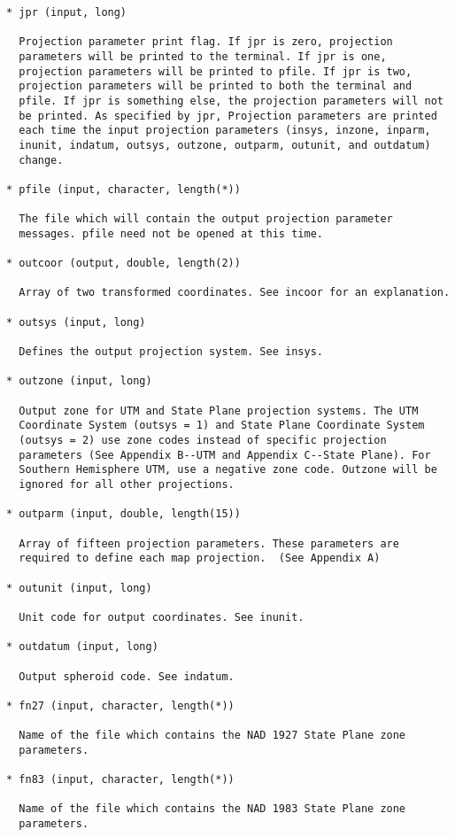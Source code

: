 \begin{verbatim}
* jpr (input, long)

  Projection parameter print flag. If jpr is zero, projection
  parameters will be printed to the terminal. If jpr is one,
  projection parameters will be printed to pfile. If jpr is two,
  projection parameters will be printed to both the terminal and
  pfile. If jpr is something else, the projection parameters will not
  be printed. As specified by jpr, Projection parameters are printed
  each time the input projection parameters (insys, inzone, inparm,
  inunit, indatum, outsys, outzone, outparm, outunit, and outdatum)
  change.

* pfile (input, character, length(*))

  The file which will contain the output projection parameter
  messages. pfile need not be opened at this time.

* outcoor (output, double, length(2))

  Array of two transformed coordinates. See incoor for an explanation.

* outsys (input, long)

  Defines the output projection system. See insys.

* outzone (input, long)

  Output zone for UTM and State Plane projection systems. The UTM
  Coordinate System (outsys = 1) and State Plane Coordinate System
  (outsys = 2) use zone codes instead of specific projection
  parameters (See Appendix B--UTM and Appendix C--State Plane). For
  Southern Hemisphere UTM, use a negative zone code. Outzone will be
  ignored for all other projections.

* outparm (input, double, length(15))

  Array of fifteen projection parameters. These parameters are
  required to define each map projection.  (See Appendix A)

* outunit (input, long)

  Unit code for output coordinates. See inunit.

* outdatum (input, long)

  Output spheroid code. See indatum.

* fn27 (input, character, length(*))

  Name of the file which contains the NAD 1927 State Plane zone
  parameters.

* fn83 (input, character, length(*))

  Name of the file which contains the NAD 1983 State Plane zone
  parameters.


\end{verbatim}
